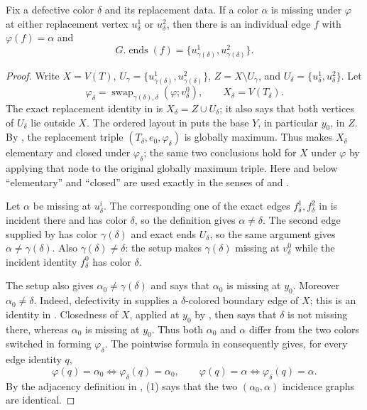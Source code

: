 \begin{helper}
Fix a defective color $\delta$ and its replacement data.  If a color
$\alpha$ is missing under $\varphi$ at either replacement vertex
$u^1_\delta$ or $u^2_\delta$, then there is an individual edge $f$ with
$\varphi(f)=\alpha$ and
\[
 G.\operatorname{ends}(f)=
 \{u^1_{\gamma(\delta)},u^2_{\gamma(\delta)}\}.
\]
\end{helper}
\begin{proof}
Write $X=V(T)$,
$U_\gamma=\{u^1_{\gamma(\delta)},u^2_{\gamma(\delta)}\}$,
$Z=X\setminus U_\gamma$, and
$U_\delta=\{u^1_\delta,u^2_\delta\}$.  Let
\[
 \varphi_\delta=\operatorname{swap}_{\gamma(\delta),\delta}
   (\varphi;v^0_\delta),\qquad X_\delta=V(T_\delta).
\]
The exact replacement identity in  is
$X_\delta=Z\cup U_\delta$; it also says that both vertices of
$U_\delta$ lie outside $X$.  The ordered layout in
 puts the base $Y$, in particular
$y_0$, in $Z$.  By , the replacement
triple $(T_\delta,e_0,\varphi_\delta)$ is globally maximum.  Thus
 makes $X_\delta$ elementary and closed
under $\varphi_\delta$; the same two conclusions hold for $X$ under
$\varphi$ by applying that node to the original globally maximum triple.
Here and below ``elementary'' and ``closed'' are used exactly in the senses
of  and
.

Let $\alpha$ be missing at $u^i_\delta$.  The corresponding one of the
exact edges $f^1_\delta,f^2_\delta$ in
 is incident there and has color $\delta$,
so the definition  gives $\alpha\ne\delta$.
The second edge supplied by  has
color $\gamma(\delta)$ and exact ends $U_\delta$, so the same argument gives
$\alpha\ne\gamma(\delta)$.  Also
$\gamma(\delta)\ne\delta$: the setup
 makes $\gamma(\delta)$ missing at
$v^0_\delta$ while the incident identity $f^0_\delta$ has color $\delta$.

The setup also gives $\alpha_0\ne\gamma(\delta)$ and says that $\alpha_0$
is missing at $y_0$.  Moreover $\alpha_0\ne\delta$.  Indeed, defectivity in
 supplies a $\delta$-colored boundary edge of $X$;
this is an identity in .  Closedness of $X$, applied
at $y_0$ by , then says that $\delta$ is not
missing there, whereas $\alpha_0$ is missing at $y_0$.  Thus both
$\alpha_0$ and $\alpha$ differ
from the two colors switched in forming $\varphi_\delta$.  The pointwise
formula in  consequently gives, for every
edge identity $q$,
\[
 \varphi(q)=\alpha_0\Longleftrightarrow
 \varphi_\delta(q)=\alpha_0,
 \qquad
 \varphi(q)=\alpha\Longleftrightarrow
 \varphi_\delta(q)=\alpha.                                  \tag{1}
\]
By the adjacency definition in , (1) says
that the two $(\alpha_0,\alpha)$ incidence graphs are identical.


\end{proof}
